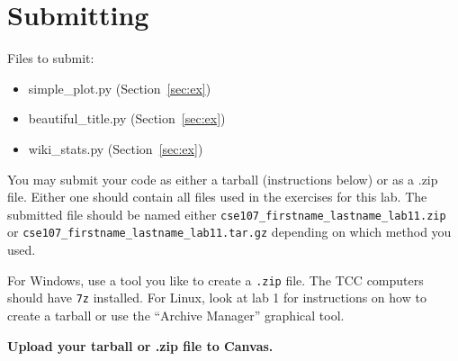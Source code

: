 \documentclass[11pt]{cselabheader}
\begin{document}
\pagebreak
\section{Submitting}

Files to submit:
\begin{itemize}
\item simple\_plot.py (Section~\ref{sec:ex})
\item beautiful\_title.py (Section~\ref{sec:ex})
\item wiki\_stats.py (Section~\ref{sec:ex})
\end{itemize}

You may submit your code as either a tarball (instructions below) or as a .zip
file. Either one should contain all files used in the exercises for this lab.
The submitted file should be named either
\texttt{cse107\_firstname\_lastname\_lab11.zip} or
\texttt{cse107\_firstname\_lastname\_lab11.tar.gz} depending on which method you
used.

For Windows, use a tool you like to create a \texttt{.zip} file. The TCC
computers should have \texttt{7z} installed. For Linux, look at lab 1 for
instructions on how to create a tarball or use the ``Archive Manager'' graphical
tool.

\begin{center}
  \textbf{Upload your tarball or .zip file to Canvas.}
\end{center}
\end{document}

